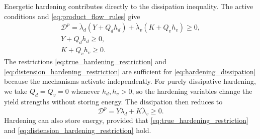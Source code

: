 \documentclass[11pt]{article}
\begin{document}
Energetic hardening contributes directly to the dissipation inequality.  The
active conditions and \eqref{eq:product_flow_rules} give
\begin{subequations}
	\label{eq:dissipative_hardening_specialization}
	\begin{gather}
		\mathcal D^p
		=\dot\lambda_d\left(Y+Q_dh_d\right)
		+\dot\lambda_v\left(K+Q_vh_v\right)\ge0,
		\label{eq:hardening_dissipation}                    \\
		Y+Q_dh_d
		\ge0,
		\label{eq:true_hardening_restriction}               \\
		K+Q_vh_v
		\ge0.
		\label{eq:distension_hardening_restriction}
	\end{gather}
\end{subequations}
The restrictions \eqref{eq:true_hardening_restriction} and
\eqref{eq:distension_hardening_restriction} are sufficient for
\eqref{eq:hardening_dissipation} because the mechanisms activate independently.
For purely dissipative hardening, we take
\(Q_d=Q_v=0\) whenever \(h_d,h_v>0\), so the hardening variables change the
yield strengths without storing energy.  The dissipation then reduces to
\begin{equation*}
	\mathcal D^p
	=Y\dot\lambda_d+K\dot\lambda_v
	\ge0.
\end{equation*}
Hardening can also store energy, provided that
\eqref{eq:true_hardening_restriction} and
\eqref{eq:distension_hardening_restriction} hold.
\end{document}

